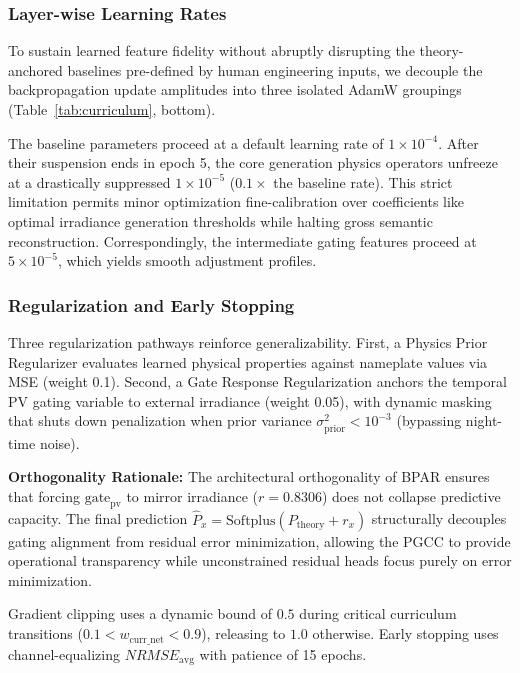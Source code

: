 \subsubsection{Layer-wise Learning Rates}
To sustain learned feature fidelity without abruptly disrupting the theory-anchored baselines pre-defined by human engineering inputs, we decouple the backpropagation update amplitudes into three isolated AdamW groupings (Table~\ref{tab:curriculum}, bottom).

The baseline parameters proceed at a default learning rate of $1 \times 10^{-4}$. After their suspension ends in epoch 5, the core generation physics operators unfreeze at a drastically suppressed $1 \times 10^{-5}$ ($0.1\times$ the baseline rate). This strict limitation permits minor optimization fine-calibration over coefficients like optimal irradiance generation thresholds while halting gross semantic reconstruction. Correspondingly, the intermediate gating features proceed at $5 \times 10^{-5}$, which yields smooth adjustment profiles.

\subsubsection{Regularization and Early Stopping}
Three regularization pathways reinforce generalizability. First, a Physics Prior Regularizer evaluates learned physical properties against nameplate values via MSE (weight 0.1). Second, a Gate Response Regularization anchors the temporal PV gating variable to external irradiance (weight 0.05), with dynamic masking that shuts down penalization when prior variance $\sigma^2_{\text{prior}} < 10^{-3}$ (bypassing night-time noise).

\textbf{Orthogonality Rationale:} The architectural orthogonality of BPAR ensures that forcing $\text{gate}_{\text{pv}}$ to mirror irradiance ($r=0.8306$) does not collapse predictive capacity. The final prediction $\hat{P}_x = \text{Softplus}(P_{\text{theory}} + r_x)$ structurally decouples gating alignment from residual error minimization, allowing the PGCC to provide operational transparency while unconstrained residual heads focus purely on error minimization.

Gradient clipping uses a dynamic bound of $0.5$ during critical curriculum transitions ($0.1 < w_{\text{curr\_net}} < 0.9$), releasing to $1.0$ otherwise. Early stopping uses channel-equalizing $NRMSE_{\text{avg}}$ with patience of 15 epochs.
